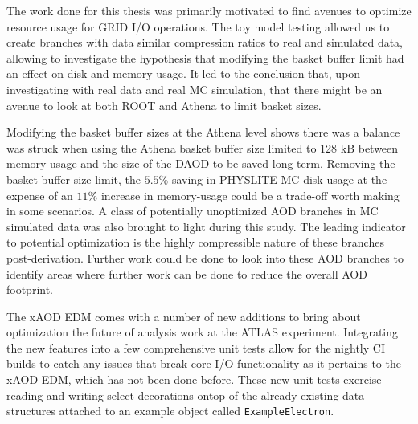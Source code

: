 The work done for this thesis was primarily motivated to find avenues to optimize resource usage for GRID I/O operations. 
The toy model testing allowed us to create branches with data similar compression ratios to real and simulated data, allowing to investigate the hypothesis that modifying the basket buffer limit had an effect on disk and memory usage.
It led to the conclusion that, upon investigating with real data and real MC simulation, that there might be an avenue to look at both ROOT and Athena to limit basket sizes. 

Modifying the basket buffer sizes at the Athena level shows there was a balance was struck when using the Athena basket buffer size limited to 128 kB between memory-usage and the size of the DAOD to be saved long-term. 
Removing the basket buffer size limit, the $5.5 \%$ saving in PHYSLITE MC disk-usage at the expense of an $11 \%$ increase in memory-usage could be a trade-off worth making in some scenarios. 
A class of potentially unoptimized AOD branches in MC simulated data was also brought to light during this study.
The leading indicator to potential optimization is the highly compressible nature of these branches post-derivation.
Further work could be done to look into these AOD branches to identify areas where further work can be done to reduce the overall AOD footprint. 

The xAOD EDM comes with a number of new additions to bring about optimization the future of analysis work at the ATLAS experiment.
Integrating the new features into a few comprehensive unit tests allow for the nightly CI builds to catch any issues that break core I/O functionality as it pertains to the xAOD EDM, which has not been done before.
These new unit-tests exercise reading and writing select decorations ontop of the already existing data structures attached to an example object called \verb|ExampleElectron|. 

